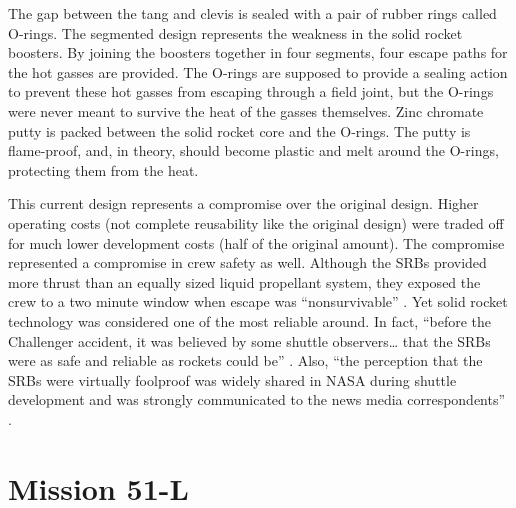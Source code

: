 The gap between the tang and clevis is sealed with a pair of
rubber rings called O-rings.
The segmented design represents the weakness in the 
solid rocket boosters.
By joining the boosters together in four segments, four
escape paths for the hot gasses are provided.
The O-rings are supposed to provide a sealing action to
prevent these hot gasses from escaping through a field
joint, but the O-rings were never meant to survive the heat
of the gasses themselves.
Zinc chromate putty is packed between the solid rocket core
and the O-rings.
The putty is flame-proof, and, in theory, should become
plastic and melt around the O-rings, protecting them from
the heat.


This current design represents a compromise over
the original design.  Higher operating costs (not complete
reusability like the original design) were traded off for
much lower development costs (half of the original amount).
The compromise represented a compromise in crew safety as
well.  Although the SRBs provided more thrust than an
equally sized liquid propellant system, they exposed the
crew to a two minute window when escape was
``nonsurvivable'' \cite[p. 59]{lewis}.
Yet solid rocket technology was considered one of the
most reliable around.  In fact, ``before the Challenger
accident, it was believed by some shuttle observers\ldots
that the SRBs were as safe and reliable as rockets could
be'' \cite[pp. 63--64]{lewis}.  Also, ``the perception that
the SRBs were virtually foolproof was widely shared in NASA
during shuttle development and was strongly communicated to
the news media correspondents'' \cite[p. 64]{lewis}.

\section{Mission 51-L}

